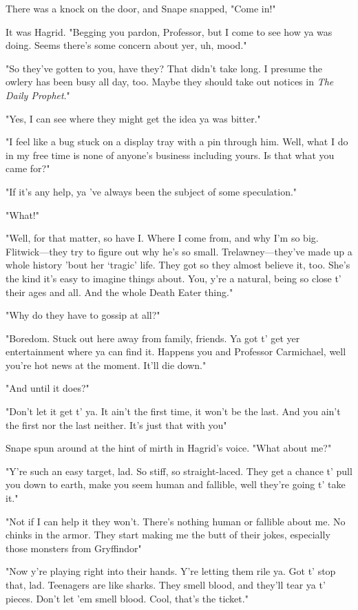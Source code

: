 There was a knock on the door, and Snape snapped, "Come in!"

It was Hagrid. "Begging you pardon, Professor, but I come to see how ya was doing. Seems there's some concern about yer, uh, mood."

"So they've gotten to you, have they? That didn't take long. I presume the owlery has been busy all day, too. Maybe they should take out notices in \emph{The Daily Prophet}."

"Yes, I can see where they might get the idea ya was bitter."

"I feel like a bug stuck on a display tray with a pin through him. Well, what I do in my free time is none of anyone's business including yours. Is that what you came for?"

"If it's any help, ya 've always been the subject of some speculation."

"What!"

"Well, for that matter, so have I. Where I come from, and why I'm so big. Flitwick—they try to figure out why he's so small. Trelawney—they've made up a whole history 'bout her `tragic' life. They got so they almost believe it, too. She's the kind it's easy to imagine things about. You, y're a natural, being so close t' their ages and all. And the whole Death Eater thing."

"Why do they have to gossip at all?"

"Boredom. Stuck out here away from family, friends. Ya got t' get yer entertainment where ya can find it. Happens you and Professor Carmichael, well you're hot news at the moment. It'll die down."

"And until it does?"

"Don't let it get t' ya. It ain't the first time, it won't be the last. And you ain't the first nor the last neither. It's just that with you{\el}"

Snape spun around at the hint of mirth in Hagrid's voice. "What about me?"

"Y're such an easy target, lad. So stiff, so straight-laced. They get a chance t' pull you down to earth, make you seem human and fallible, well they're going t' take it."

"Not if I can help it they won't. There's nothing human or fallible about me. No chinks in the armor. They start making me the butt of their jokes, especially those monsters from Gryffindor{\el}"

"Now y're playing right into their hands. Y're letting them rile ya. Got t' stop that, lad. Teenagers are like sharks. They smell blood, and they'll tear ya t' pieces. Don't let 'em smell blood. Cool, that's the ticket."

